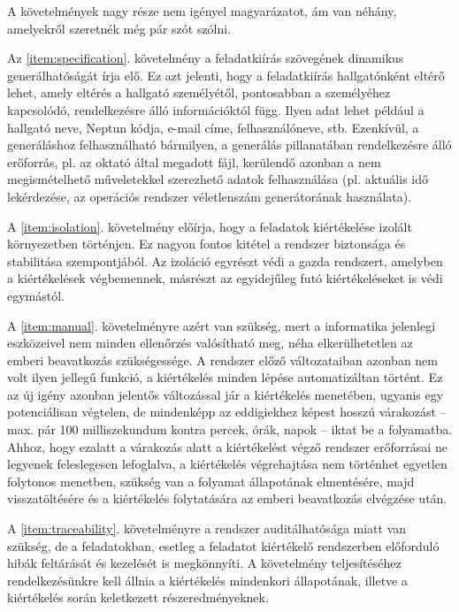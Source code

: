 A követelmények nagy része nem igényel magyarázatot, ám van néhány, amelyekről szeretnék még pár szót szólni.

Az \ref{item:specification}. követelmény a feladatkiírás szövegének dinamikus generálhatóságát írja elő.
Ez azt jelenti, hogy a feladatkiírás hallgatónként eltérő lehet, amely eltérés a hallgató személyétől, pontosabban a személyéhez kapcsolódó, rendelkezésre álló információktól függ.
Ilyen adat lehet például a hallgató neve, Neptun kódja, e-mail címe, felhasználóneve, stb.
Ezenkívül, a generáláshoz felhasználható bármilyen, a generálás pillanatában rendelkezésre álló erőforrás, pl. az oktató által megadott fájl, kerülendő azonban a nem megismételhető műveletekkel szerezhető adatok felhasználása (pl. aktuális idő lekérdezése, az operációs rendszer véletlenszám generátorának használata).

A \ref{item:isolation}. követelmény előírja, hogy a feladatok kiértékelése izolált környezetben történjen.
Ez nagyon fontos kitétel a rendszer biztonsága és stabilitása szempontjából.
Az izoláció egyrészt védi a gazda rendszert, amelyben a kiértékelések végbemennek, másrészt az egyidejűleg futó kiértékeléseket is védi egymástól.

A \ref{item:manual}. követelményre azért van szükség, mert a informatika jelenlegi eszközeivel nem minden ellenőrzés valósítható meg, néha elkerülhetetlen az emberi beavatkozás szükségessége.
A rendszer előző változataiban azonban nem volt ilyen jellegű funkció, a kiértékelés minden lépése automatizáltan történt.
Ez az új igény azonban jelentős változással jár a kiértékelés menetében, ugyanis egy potenciálisan végtelen, de mindenképp az eddigiekhez képest hosszú várakozást -- max. pár 100 milliszekundum kontra percek, órák, napok -- iktat be a folyamatba.
Ahhoz, hogy ezalatt a várakozás alatt a kiértékelést végző rendszer erőforrásai ne legyenek feleslegesen lefoglalva, a kiértékelés végrehajtása nem történhet egyetlen folytonos menetben, szükség van a folyamat állapotának elmentésére, majd visszatöltésére és a kiértékelés folytatására az emberi beavatkozás elvégzése után.

A \ref{item:traceability}. követelményre a rendszer auditálhatósága miatt van szükség, de a feladatokban, esetleg a feladatot kiértékelő rendszerben előforduló hibák feltárását és kezelését is megkönnyíti.
A követelmény teljesítéséhez rendelkezésünkre kell állnia a kiértékelés mindenkori állapotának, illetve a kiértékelés során keletkezett részeredményeknek.

